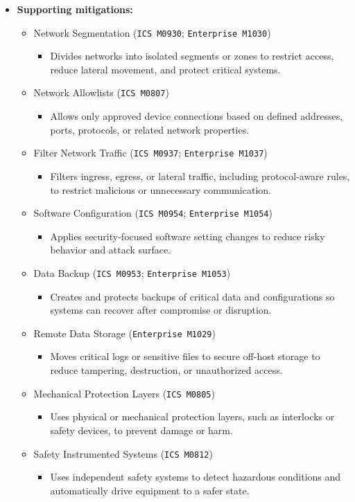 \documentclass[10pt,a4paper,oneside]{report}
\begin{document}
\begin{itemize}
\item \textbf{Supporting mitigations:}
\begin{itemize}
\item Network Segmentation (\texttt{ICS M0930}; \texttt{Enterprise M1030})
\begin{itemize}
\item Divides networks into isolated segments or zones to restrict access, reduce lateral movement, and protect critical systems.
\end{itemize}
\item Network Allowlists (\texttt{ICS M0807})
\begin{itemize}
\item Allows only approved device connections based on defined addresses, ports, protocols, or related network properties.
\end{itemize}
\item Filter Network Traffic (\texttt{ICS M0937}; \texttt{Enterprise M1037})
\begin{itemize}
\item Filters ingress, egress, or lateral traffic, including protocol-aware rules, to restrict malicious or unnecessary communication.
\end{itemize}
\item Software Configuration (\texttt{ICS M0954}; \texttt{Enterprise M1054})
\begin{itemize}
\item Applies security-focused software setting changes to reduce risky behavior and attack surface.
\end{itemize}
\item Data Backup (\texttt{ICS M0953}; \texttt{Enterprise M1053})
\begin{itemize}
\item Creates and protects backups of critical data and configurations so systems can recover after compromise or disruption.
\end{itemize}
\item Remote Data Storage (\texttt{Enterprise M1029})
\begin{itemize}
\item Moves critical logs or sensitive files to secure off-host storage to reduce tampering, destruction, or unauthorized access.
\end{itemize}
\item Mechanical Protection Layers (\texttt{ICS M0805})
\begin{itemize}
\item Uses physical or mechanical protection layers, such as interlocks or safety devices, to prevent damage or harm.
\end{itemize}
\item Safety Instrumented Systems (\texttt{ICS M0812})
\begin{itemize}
\item Uses independent safety systems to detect hazardous conditions and automatically drive equipment to a safer state.
\end{itemize}
\end{itemize}
\end{itemize}
\end{document}
